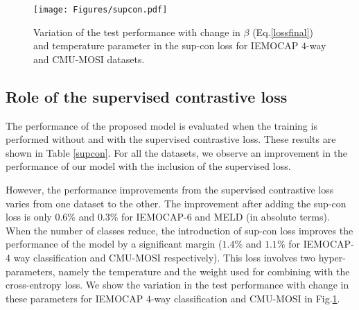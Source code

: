 \documentclass[lettersize,journal]{IEEEtran}
\begin{document}
\begin{table}[t!]
\caption{The weighted F1 scores (in $\%$) with and without the supervised contrastive loss. }
\label{supcon}
\begin{center}
\end{center}
\end{table}
\begin{figure}[t!]
    \centering
    \texttt{[image: Figures/supcon.pdf]}
    \caption{Variation of the test performance with change in $\beta$ (Eq.\ref{lossfinal}) and temperature parameter in the sup-con loss for IEMOCAP $4$-way and CMU-MOSI datasets.}
    \label{fig:supcon}
\end{figure}
\subsection{Role of the supervised contrastive loss}
The performance of the proposed model is evaluated when the training is performed without and with the supervised contrastive loss. These results are shown in Table \ref{supcon}. For all the datasets, we observe an improvement in the performance of our model with the inclusion of the supervised loss.

However, the performance improvements from   the supervised contrastive loss  varies from one dataset to the other.  
The improvement after adding  the sup-con loss is only $0.6\%$ and $0.3\%$ for IEMOCAP-6 and MELD (in absolute terms). When the number of classes reduce, the introduction of sup-con loss improves the performance of the model by a significant margin ($1.4\%$ and $1.1\%$ for IEMOCAP-4 way classification and CMU-MOSI respectively). 
This loss involves two hyper-parameters, namely the temperature and the weight used for combining with the cross-entropy loss.  We show the variation in the test performance with change in these parameters for IEMOCAP $4$-way classification and CMU-MOSI in Fig.\ref{fig:supcon}.
\end{document}
